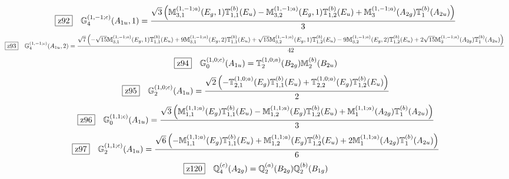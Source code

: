 \documentclass[fleqn,10pt,landscape]{jsarticle}
\begin{document}
\begin{dmath*}
\hspace*{3mm}\fbox{z92}\quad \mathbb{G}_{4}^{(1,-1;c)}(A_{1u},1)=\frac{\sqrt{3} \left(\mathbb{M}_{3,1}^{(1,-1;a)}(E_{g},1) \mathbb{T}_{1,1}^{(b)}(E_{u}) - \mathbb{M}_{3,2}^{(1,-1;a)}(E_{g},1) \mathbb{T}_{1,2}^{(b)}(E_{u}) + \mathbb{M}_{3}^{(1,-1;a)}(A_{2g}) \mathbb{T}_{1}^{(b)}(A_{2u})\right)}{3}
\end{dmath*}
\begin{dmath*}
\hspace*{3mm}\fbox{z93}\quad \mathbb{G}_{4}^{(1,-1;c)}(A_{1u},2)=\frac{\sqrt{7} \left(- \sqrt{15} \mathbb{M}_{3,1}^{(1,-1;a)}(E_{g},1) \mathbb{T}_{1,1}^{(b)}(E_{u}) + 9 \mathbb{M}_{3,1}^{(1,-1;a)}(E_{g},2) \mathbb{T}_{1,1}^{(b)}(E_{u}) + \sqrt{15} \mathbb{M}_{3,2}^{(1,-1;a)}(E_{g},1) \mathbb{T}_{1,2}^{(b)}(E_{u}) - 9 \mathbb{M}_{3,2}^{(1,-1;a)}(E_{g},2) \mathbb{T}_{1,2}^{(b)}(E_{u}) + 2 \sqrt{15} \mathbb{M}_{3}^{(1,-1;a)}(A_{2g}) \mathbb{T}_{1}^{(b)}(A_{2u})\right)}{42}
\end{dmath*}
\begin{dmath*}
\hspace*{3mm}\fbox{z94}\quad \mathbb{G}_{0}^{(1,0;c)}(A_{1u})=\mathbb{T}_{2}^{(1,0;a)}(B_{2g}) \mathbb{M}_{2}^{(b)}(B_{2u})
\end{dmath*}
\begin{dmath*}
\hspace*{3mm}\fbox{z95}\quad \mathbb{G}_{2}^{(1,0;c)}(A_{1u})=\frac{\sqrt{2} \left(- \mathbb{T}_{2,1}^{(1,0;a)}(E_{g}) \mathbb{T}_{1,1}^{(b)}(E_{u}) + \mathbb{T}_{2,2}^{(1,0;a)}(E_{g}) \mathbb{T}_{1,2}^{(b)}(E_{u})\right)}{2}
\end{dmath*}
\begin{dmath*}
\hspace*{3mm}\fbox{z96}\quad \mathbb{G}_{0}^{(1,1;c)}(A_{1u})=\frac{\sqrt{3} \left(\mathbb{M}_{1,1}^{(1,1;a)}(E_{g}) \mathbb{T}_{1,1}^{(b)}(E_{u}) - \mathbb{M}_{1,2}^{(1,1;a)}(E_{g}) \mathbb{T}_{1,2}^{(b)}(E_{u}) + \mathbb{M}_{1}^{(1,1;a)}(A_{2g}) \mathbb{T}_{1}^{(b)}(A_{2u})\right)}{3}
\end{dmath*}
\begin{dmath*}
\hspace*{3mm}\fbox{z97}\quad \mathbb{G}_{2}^{(1,1;c)}(A_{1u})=\frac{\sqrt{6} \left(- \mathbb{M}_{1,1}^{(1,1;a)}(E_{g}) \mathbb{T}_{1,1}^{(b)}(E_{u}) + \mathbb{M}_{1,2}^{(1,1;a)}(E_{g}) \mathbb{T}_{1,2}^{(b)}(E_{u}) + 2 \mathbb{M}_{1}^{(1,1;a)}(A_{2g}) \mathbb{T}_{1}^{(b)}(A_{2u})\right)}{6}
\end{dmath*}
\begin{dmath*}
\hspace*{3mm}\fbox{z120}\quad \mathbb{Q}_{4}^{(c)}(A_{2g})=\mathbb{Q}_{2}^{(a)}(B_{2g}) \mathbb{Q}_{2}^{(b)}(B_{1g})
\end{dmath*}
\end{document}
